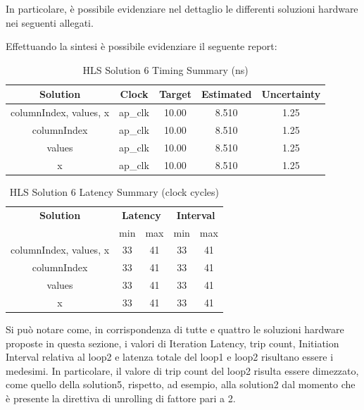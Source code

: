 In particolare, è possibile evidenziare nel dettaglio le differenti soluzioni hardware nei seguenti allegati.





Effettuando la sintesi è possibile evidenziare il seguente report:\\

\begin{table}[H]
	\centering
	\begin{tabular}{|c|c|c|c|c|}
		\hline
		\textbf{Solution} & \textbf{Clock} & \textbf{Target} & \textbf{Estimated} & \textbf{Uncertainty} \\
		\hline
		columnIndex, values, x & ap\_clk & 10.00 & 8.510 & 1.25 \\
		\hline
		columnIndex & ap\_clk & 10.00 & 8.510 & 1.25 \\
		\hline
		values & ap\_clk & 10.00 & 8.510 & 1.25 \\
		\hline
		x & ap\_clk & 10.00 & 8.510 & 1.25 \\
		\hline
	\end{tabular}
	\caption{HLS Solution 6 Timing Summary (ns)}
	\label{tab:hls-solution-6-timing-summary}
\end{table}

\begin{table}[H]
	\centering
	\begin{tabular}{|c|c|c|c|c|}
		\hline
		\multicolumn{1}{|c|}{\textbf{Solution}} & \multicolumn{2}{|c|}{\textbf{Latency}} & \multicolumn{2}{|c|}{\textbf{Interval}} \\
		& min & max & min & max \\
		\hline
		columnIndex, values, x & 33 & 41 & 33 & 41 \\
		\hline
		columnIndex & 33 & 41 & 33 & 41 \\
		\hline
		values & 33 & 41 & 33 & 41 \\
		\hline
		x & 33 & 41 & 33 & 41 \\
		\hline
	\end{tabular}
	\caption{HLS Solution 6 Latency Summary (clock cycles)}
	\label{tab:hls-solution-6-latency-summary}
\end{table}

Si può notare come, in corrispondenza di tutte e quattro le soluzioni hardware proposte in questa sezione, i valori di Iteration Latency, trip count, Initiation Interval relativa al loop2 e latenza totale del loop1 e loop2 risultano essere i medesimi. In particolare, il valore di trip count del loop2 risulta essere dimezzato, come quello della solution5, rispetto, ad esempio, alla solution2 dal momento che è presente la direttiva di unrolling di fattore pari a 2. 

